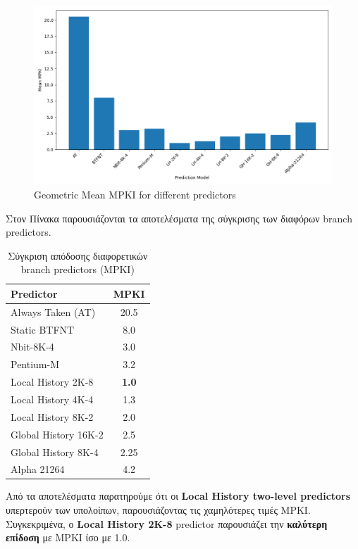 \documentclass{article}
\begin{document}
\begin{figure}[H]
    \centering
    \includegraphics[width=1\textwidth]{figures/5_6/geom_mean.png}
    \caption{Geometric Mean MPKI for different predictors}
    \label{fig:mean_mpkis_predictors}
\end{figure}

\pagebreak

Στον Πίνακα παρουσιάζονται τα αποτελέσματα της σύγκρισης των διαφόρων branch predictors.

\begin{table}[H]
    \centering
    \begin{tabular}{|l|c|}
        \hline
        \textbf{Predictor} & \textbf{MPKI} \\
        \hline
        Always Taken (AT) & 20.5 \\
        Static BTFNT & 8.0 \\
        Nbit-8K-4 & 3.0 \\
        Pentium-M & 3.2 \\
        Local History 2K-8 & \textbf{1.0} \\
        Local History 4K-4 & 1.3 \\
        Local History 8K-2 & 2.0 \\
        Global History 16K-2 & 2.5 \\
        Global History 8K-4 & 2.25 \\
        Alpha 21264 & 4.2 \\
        \hline
    \end{tabular}
    \caption{Σύγκριση απόδοσης διαφορετικών branch predictors (MPKI)}
    \label{tab:predictor_comparison}
\end{table}

Από τα αποτελέσματα παρατηρούμε ότι οι \textbf{Local History two-level predictors} υπερτερούν των υπολοίπων, παρουσιάζοντας τις χαμηλότερες τιμές MPKI. Συγκεκριμένα, ο \textbf{Local History 2K-8} predictor παρουσιάζει την \textbf{καλύτερη επίδοση} με MPKI ίσο με 1.0.
\end{document}
